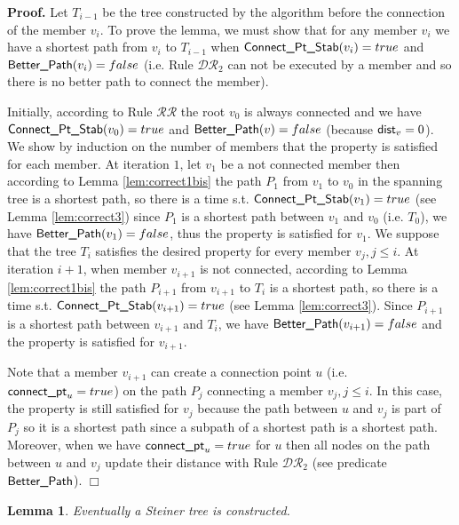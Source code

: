 \documentclass[11pt]{article}
\newtheorem{lemma}{Lemma}
\newenvironment{proof}{\noindent \begin{rm}{\textbf{Proof.} }}{\hspace*{\fill}$\Box$\par\end{rm} \vspace{.3cm}}
\newcommand{\dist}{\mbox{\sf dist}}
\newcommand{\connectpt}{\mbox{\sf connect\_pt}}
\newcommand{\Better}{\mbox{\sf Better\_Path}}
\newcommand{\ConnectPtS}{\mbox{\sf Connect\_Pt\_Stab}}
\newcommand{\ARB}{$\mathcal{DR}_2$}
\newcommand{\CRA}{$\mathcal{RR}$}
\begin{document}
\begin{proof}
Let $T_{i-1}$ be the tree constructed by the algorithm before the
connection of the member $v_i$. To prove the lemma, we must show that
for any member $v_i$ we have a shortest path from $v_i$ to $T_{i-1}$
when $\ConnectPtS(v_i)=true$ and $\Better(v_i)=false$
(i.e. Rule \ARB\/ can not be executed by a member and so there is no
better path to connect the member).

Initially, according to Rule \CRA\/ the root $v_0$ is always connected and
we have $\ConnectPtS(v_0)=true$ and
$\Better(v)=false$ (because $\dist_v=0$). We show by induction on
the number of members that the property is satisfied for each
member. At iteration $1$, let $v_1$ be a not connected member then
according to Lemma \ref{lem:correct1bis} the path $P_1$ from $v_1$ to
$v_0$ in the spanning tree is a shortest path, so there is a time
s.t. $\ConnectPtS(v_1)=true$ (see Lemma
\ref{lem:correct3}) since $P_1$ is a shortest path between $v_1$ and
$v_0$ (i.e. $T_0$), we have $\Better(v_1)=false$, thus the
property is satisfied for $v_1$. We suppose that the tree $T_i$
satisfies the desired property for every member $v_j, j \leq i$. At
iteration $i+1$, when member $v_{i+1}$ is not connected, according to
Lemma \ref{lem:correct1bis} the path $P_{i+1}$ from $v_{i+1}$ to $T_i$
is a shortest path, so there is a time
s.t. $\ConnectPtS(v_{i+1})=true$ (see Lemma
\ref{lem:correct3}). Since $P_{i+1}$ is a shortest path between
$v_{i+1}$ and $T_i$, we have $\Better(v_{i+1})=false$ and the
property is satisfied for $v_{i+1}$.

Note that a member $v_{i+1}$ can create a connection point $u$
(i.e. $\connectpt_u=true$) on the path $P_j$ connecting a
member $v_j, j \leq i$. In this case, the property is still satisfied
for $v_j$ because the path between $u$ and $v_j$ is part of $P_j$ so
it is a shortest path since a subpath of a shortest path is a shortest
path. Moreover, when we have $\connectpt_u=true$ for $u$ then
all nodes on the path between $u$ and $v_j$ update their distance with
Rule \ARB\/ (see predicate $\Better$).
\end{proof}

\begin{lemma}
\label{lem:correct5}
Eventually a Steiner tree is constructed.
\end{lemma}
\end{document}
